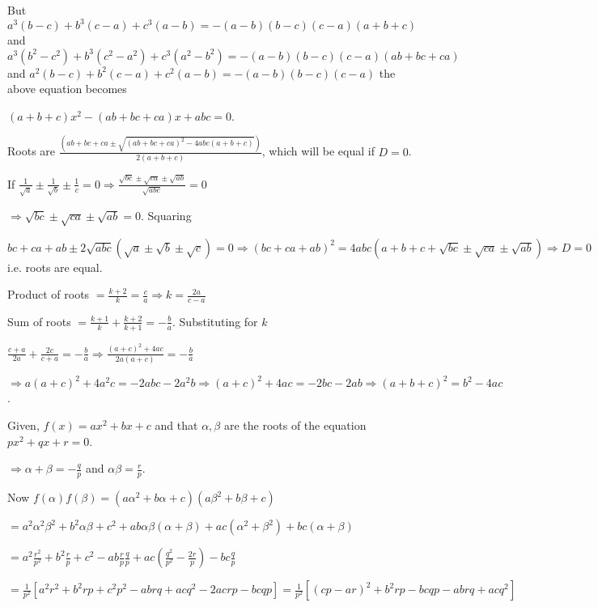   But $a^3(b - c) + b^3(c - a) + c^3(a - b) = -(a - b)(b - c)(c - a)(a + b + c)$ and $a^3(b^2 - c^2) +
  b^3(c^2 - a^2) + c^3(a^2 - b^2) = -(a - b)(b - c)(c -a)(ab + bc + ca)$ and $a^2(b - c) + b^2(c - a) +
  c^2(a - b) = -(a - b)(b - c)(c - a)$ the above equation becomes

  $(a + b + c)x^2 - (ab + bc + ca)x + abc = 0$.

  Roots are $\frac{(ab + bc + ca \pm \sqrt{(ab + bc + ca)^2 - 4abc(a + b + c)})}{2(a + b + c)}$, which will
  be equal if $D = 0$.

  If $\frac{1}{\sqrt{a}}\pm \frac{1}{\sqrt{b}}\pm \frac{1}{c} = 0\Rightarrow \frac{\sqrt{bc} \pm \sqrt{ca}
    \pm \sqrt{ab}}{\sqrt{abc}} = 0$

  $\Rightarrow \sqrt{bc} \pm \sqrt{ca} \pm \sqrt{ab} = 0$. Squaring

  $bc + ca + ab \pm 2\sqrt{abc}(\sqrt{a}\pm \sqrt{b} \pm \sqrt{c}) = 0\Rightarrow (bc + ca + ab)^2 = 4abc(a
  + b + c + \sqrt{bc} \pm \sqrt{ca} \pm \sqrt{ab})\Rightarrow D = 0$ i.e. roots are equal.
\item Product of roots $= \frac{k + 2}{k} = \frac{c}{a}\Rightarrow k = \frac{2a}{c - a}$

  Sum of roots $= \frac{k + 1}{k} + \frac{k + 2}{k + 1} = -\frac{b}{a}$. Substituting for $k$

  $\frac{c + a}{2a} + \frac{2c}{c + a} = - \frac{b}{a}\Rightarrow \frac{(a + c)^2 + 4ac}{2a(a + c)} = -\frac{b}{a}$

  $\Rightarrow a(a + c)^2 + 4a^2c = -2abc - 2a^2b\Rightarrow (a + c)^2 + 4ac = -2bc - 2ab\Rightarrow (a + b
  + c)^2 = b^2 - 4ac$.
\item Given, $f(x) = ax^2 + bx + c$ and that $\alpha,\beta$ are the roots of the equation $px^2 + qx +
  r = 0$.

  $\Rightarrow \alpha + \beta = -\frac{q}{p}$ and $\alpha\beta = \frac{r}{p}$.

  Now $f(\alpha)f(\beta) = (a\alpha^2 + b\alpha + c)(a\beta^2 + b\beta + c)$

  $= a^2\alpha^2\beta^2 + b^2\alpha\beta + c^2 + ab\alpha\beta(\alpha + \beta) + ac(\alpha^2 + \beta^2) +
  bc(\alpha + \beta)$

  $= a^2\frac{r^2}{p^2} + b^2\frac{r}{p} + c^2 - ab\frac{r}{p}\frac{q}{p} + ac\left(\frac{q^2}{p^2} -
  \frac{2r}{p}\right) - bc\frac{q}{p}$

  $= \frac{1}{p^2}[a^2r^2 + b^2rp + c^2p^2 - abrq + acq^2 - 2acrp - bcqp] = \frac{1}{p^2}[(cp - ar)^2 +
    b^2rp - bcqp - abrq + acq^2]$

